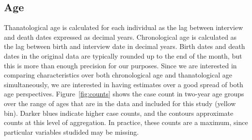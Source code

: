 \documentclass{article}
\begin{document}
\subsection{Age}
Thanatological age is calculated for each individual as the lag between
interview and death dates expressed as decimal years. Chronological age is
calculated as the lag between birth and interview date in decimal years. Birth
dates and death dates in the original data are typically rounded up to the end
of the month, but this is more than enough precision for our purposes. Since we
are interested in comparing characteristics over both chronological age and
thanatological age simultaneously, we are interested in having estimates over a
good spread of both age perspectives.
Figure~\ref{fig:counts} shows the case count in two-year age groups over the
range of ages that are in the data and included for this study (yellow bin).
Darker blues indicate higher case counts, and the contours approximate counts at
this level of aggregation. In practice, these counts are a maximum, since
particular variables studided may be missing.
\end{document}
